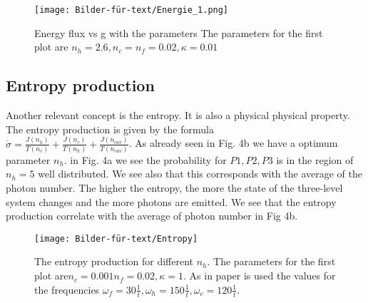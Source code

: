 \documentclass[12pt,a4paper]{article}
\begin{document}
\begin{figure}[hbtp]
\centering
\texttt{[image: Bilder-für-text/Energie\_1.png]}
\caption{Energy flux vs g with the parameters The parameters for the first plot are $ n_h=2.6,n_c= n_f=0.02,\kappa=0.01 $}
\end{figure}


\subsection{Entropy production}
Another relevant concept is the entropy. It is also a physical physical property. 
The entropy production is given by the formula\\ $\dot{\sigma} =\frac{J(n_h)}{T(n_c)}+\frac{J(n_c)}{T(n_h)}+\frac{J(n_{cav})}{T(n_{cav})}$.
As already seen in Fig. 4b we have a optimum parameter $n_h$.  in Fig. 4a we see the probability for $P1,P2,P3$ is in the region of $n_h=5 $ well distributed. We see also that  this corresponds with the average of the photon number.
The higher the entropy, the more the state of the three-level system changes and the more photons are emitted.
We see that the entropy production correlate with the average of photon number in Fig 4b.
\begin{figure}[hbtp]
\centering
\texttt{[image: Bilder-für-text/Entropy]}
\caption{The entropy production for different $n_h$. The parameters for the first plot are$n_c=0.001 n_f=0.02,\kappa=1$. As in paper \cite{Li2017} is used the values for the frequencies $\omega_f=30\frac{1}{t},\omega_h=150\frac{1}{t}, \omega_c=120\frac{1}{t}$.}
\end{figure}



\newpage
\end{document}
